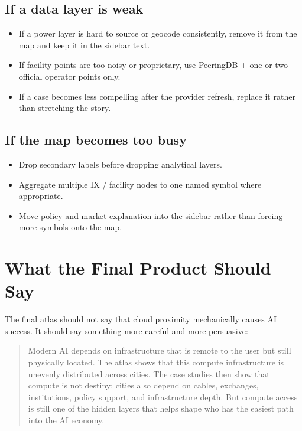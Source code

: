 \documentclass[11pt]{article}
\begin{document}
\subsection{If a data layer is weak}
\begin{itemize}[leftmargin=1.4em,itemsep=0.25em]
    \item If a power layer is hard to source or geocode consistently, remove it from the map and keep it in the sidebar text.
    \item If facility points are too noisy or proprietary, use PeeringDB + one or two official operator points only.
    \item If a case becomes less compelling after the provider refresh, replace it rather than stretching the story.
\end{itemize}

\subsection{If the map becomes too busy}
\begin{itemize}[leftmargin=1.4em,itemsep=0.25em]
    \item Drop secondary labels before dropping analytical layers.
    \item Aggregate multiple IX / facility nodes to one named symbol where appropriate.
    \item Move policy and market explanation into the sidebar rather than forcing more symbols onto the map.
\end{itemize}

\section{What the Final Product Should Say}

The final atlas should not say that cloud proximity mechanically causes AI success. It should say something more careful and more persuasive:

\begin{quote}
Modern AI depends on infrastructure that is remote to the user but still physically located. The atlas shows that this compute infrastructure is unevenly distributed across cities. The case studies then show that compute is not destiny: cities also depend on cables, exchanges, institutions, policy support, and infrastructure depth. But compute access is still one of the hidden layers that helps shape who has the easiest path into the AI economy.
\end{quote}
\end{document}
